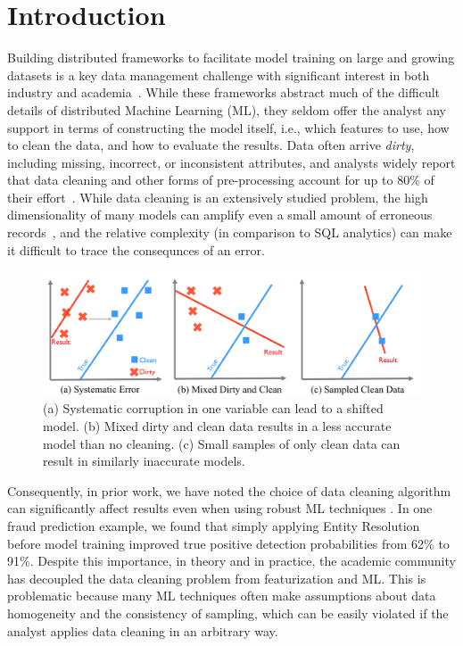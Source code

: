 \section{Introduction}
Building distributed frameworks to facilitate model training on large and growing datasets is a key data management challenge with significant interest in both industry and academia~\cite{bdas, alexandrov2014stratosphere, crotty2014tupleware, tensor}.
While these frameworks abstract much of the difficult details of distributed Machine Learning (ML), they seldom offer the analyst any support in terms of constructing the model itself, i.e., which features to use, how to clean the data, and how to evaluate the results.
Data often arrive \emph{dirty}, including missing, incorrect, or inconsistent attributes, and analysts widely report that data cleaning and other forms of pre-processing account for up to 80\% of their effort~\cite{nytimes, kandel2012}.
While data cleaning is an extensively studied problem, the high dimensionality of many models can amplify even a small amount of erroneous records~\cite{xiaofeature}, and the relative complexity (in comparison to SQL analytics) can make it difficult to trace the consequnces of an error.

\begin{figure}[t]
\centering
 \includegraphics[width=\columnwidth]{figs/update-arch.png}
 \caption{(a) Systematic corruption in one variable can lead to a shifted model. 
 (b) Mixed dirty and clean data results in a less accurate model than no cleaning.
(c) Small samples of only clean data can result in similarly inaccurate models. \label{update-arch1}}
\end{figure}

Consequently, in prior work, we have noted the choice of data cleaning algorithm can significantly affect results even when using robust ML techniques \cite{activecleanarxiv, DBLP:conf/case/MahlerKLSMKPWFAG14}.
In one fraud prediction example, we found that simply applying Entity Resolution before model training improved true positive detection probabilities from 62\% to 91\%. 
Despite this importance, in theory and in practice, the academic community has decoupled the data cleaning problem from featurization and ML.
This is problematic because many ML techniques often make assumptions about data homogeneity and the consistency of sampling, which can be easily violated if the analyst applies data cleaning in an arbitrary way.


